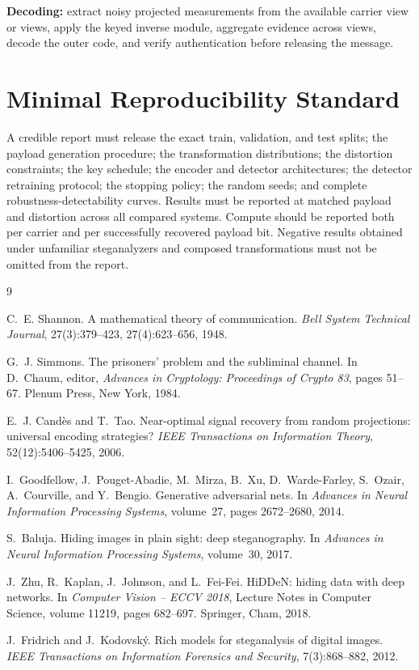 \documentclass[11pt]{article}
\begin{document}
\textbf{Decoding:} extract noisy projected measurements from the available carrier view or views, apply the keyed inverse module, aggregate evidence across views, decode the outer code, and verify authentication before releasing the message.

\section{Minimal Reproducibility Standard}

A credible report must release the exact train, validation, and test splits; the payload generation procedure; the transformation distributions; the distortion constraints; the key schedule; the encoder and detector architectures; the detector retraining protocol; the stopping policy; the random seeds; and complete robustness-detectability curves. Results must be reported at matched payload and distortion across all compared systems. Compute should be reported both per carrier and per successfully recovered payload bit. Negative results obtained under unfamiliar steganalyzers and composed transformations must not be omitted from the report.

\begin{thebibliography}{9}

C.~E. Shannon.
\newblock A mathematical theory of communication.
\newblock \emph{Bell System Technical Journal}, 27(3):379--423, 27(4):623--656, 1948.

G.~J. Simmons.
\newblock The prisoners' problem and the subliminal channel.
\newblock In D.~Chaum, editor, \emph{Advances in Cryptology: Proceedings of Crypto 83}, pages 51--67. Plenum Press, New York, 1984.

E.~J. Cand\`es and T.~Tao.
\newblock Near-optimal signal recovery from random projections: universal encoding strategies?
\newblock \emph{IEEE Transactions on Information Theory}, 52(12):5406--5425, 2006.

I.~Goodfellow, J.~Pouget-Abadie, M.~Mirza, B.~Xu, D.~Warde-Farley, S.~Ozair, A.~Courville, and Y.~Bengio.
\newblock Generative adversarial nets.
\newblock In \emph{Advances in Neural Information Processing Systems}, volume~27, pages 2672--2680, 2014.

S.~Baluja.
\newblock Hiding images in plain sight: deep steganography.
\newblock In \emph{Advances in Neural Information Processing Systems}, volume~30, 2017.

J.~Zhu, R.~Kaplan, J.~Johnson, and L.~Fei-Fei.
\newblock HiDDeN: hiding data with deep networks.
\newblock In \emph{Computer Vision -- ECCV 2018}, Lecture Notes in Computer Science, volume 11219, pages 682--697. Springer, Cham, 2018.

J.~Fridrich and J.~Kodovsk\'y.
\newblock Rich models for steganalysis of digital images.
\newblock \emph{IEEE Transactions on Information Forensics and Security}, 7(3):868--882, 2012.

\end{thebibliography}
\end{document}
